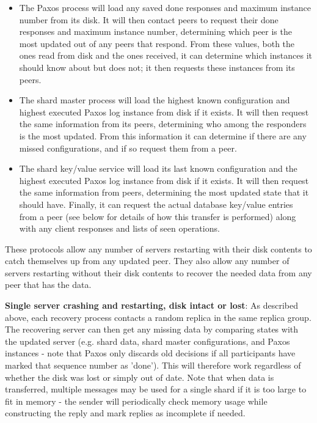 \documentclass[letterpaper,10pt]{article}
\begin{document}
\begin{itemize}
\item The Paxos process will load any saved done responses and maximum
  instance number from its disk.  It will then contact peers to
  request their done responses and maximum instance number,
  determining which peer is the most updated out of any peers that
  respond.  From these values, both the ones read from disk and the
  ones received, it can determine which instances it should know about
  but does not; it then requests these instances from its peers.
\item The shard master process will load the highest known
  configuration and highest executed Paxos log instance from disk if
  it exists.  It will then request the same information from its
  peers, determining who among the responders is the most updated.
  From this information it can determine if there are any missed
  configurations, and if so request them from a peer.
\item The shard key/value service will load its last known
  configuration and the highest executed Paxos log instance from disk
  if it exists.  It will then request the same information from peers,
  determining the most updated state that it should have.  Finally, it
  can request the actual database key/value entries from a peer (see
  below for details of how this transfer is performed) along with any
  client responses and lists of seen operations.
\end{itemize}

These protocols allow any number of servers restarting with their disk contents to catch themselves up from any updated peer.  They also allow any number of servers restarting without their disk contents to recover the needed data from any peer that has the data.

\textbf{Single server crashing and restarting, disk intact or lost}: As described above, each
recovery process contacts a random replica in the same replica group.  The recovering server can then get any missing data by comparing states with the updated server (e.g. shard data, shard master configurations, and Paxos instances - note that Paxos only discards old decisions if all participants have marked that sequence number as 'done').  This will therefore work regardless of whether the disk was lost or simply out of date.  Note that when data is transferred, multiple messages may be used for a single shard if it is too large to fit in memory - the sender will periodically check memory usage while constructing the reply and mark replies as incomplete if needed.
\end{document}
